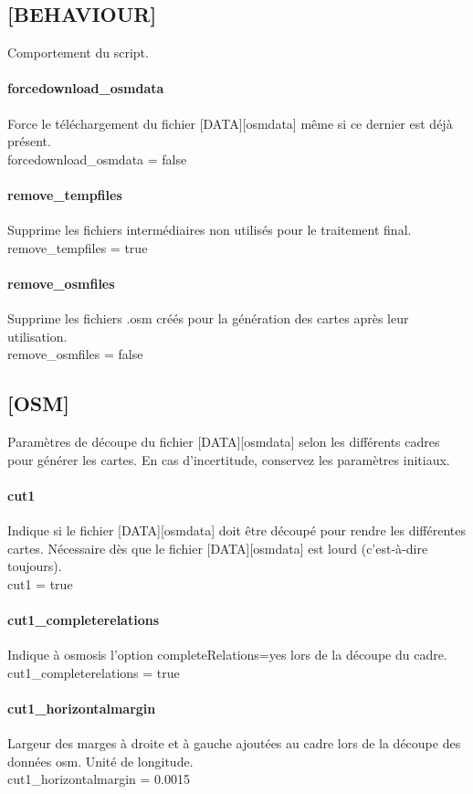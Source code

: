 \documentclass[12pt,french]{article}
\begin{document}
\subsection{[BEHAVIOUR]} Comportement du script.
\paragraph{forcedownload\_osmdata} Force le téléchargement du fichier [DATA][osmdata] même si ce dernier est déjà présent.\\
forcedownload\_osmdata = false
\paragraph{remove\_tempfiles} Supprime les fichiers intermédiaires non utilisés pour le traitement final.\\
remove\_tempfiles = true
\paragraph{remove\_osmfiles} Supprime les fichiers .osm créés pour la génération des cartes après leur utilisation. \\
remove\_osmfiles = false

\subsection{[OSM]} Paramètres de découpe du fichier [DATA][osmdata] selon les différents cadres pour générer les cartes. En cas d'incertitude, conservez les paramètres initiaux. 
\paragraph{cut1} Indique si le fichier [DATA][osmdata] doit être découpé pour rendre les différentes cartes. Nécessaire dès que le fichier [DATA][osmdata] est lourd (c'est-à-dire toujours).\\
cut1 = true
\paragraph{cut1\_completerelations} Indique à osmosis l'option completeRelations=yes lors de la découpe du cadre.\\
cut1\_completerelations = true
\paragraph{cut1\_horizontalmargin} Largeur des marges à droite et à gauche ajoutées au cadre lors de la découpe des données osm. Unité de longitude.\\
cut1\_horizontalmargin = 0.0015
\end{document}

